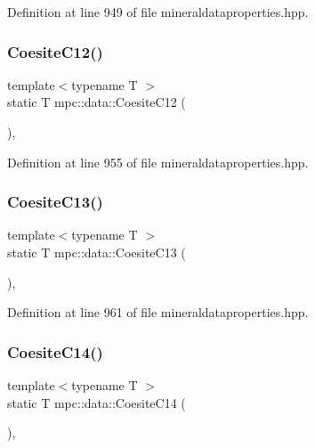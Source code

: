 Definition at line 949 of file mineraldataproperties.\+hpp.

\mbox{\label{namespacempc_1_1data_a0588a25ac2a6d4980bbe53e28e56f057}} 
\subsubsection{\texorpdfstring{Coesite\+C12()}{CoesiteC12()}}
{\footnotesize\ttfamily template$<$typename T $>$ \\
static T mpc\+::data\+::\+Coesite\+C12 (\begin{DoxyParamCaption}{ }\end{DoxyParamCaption})\hspace{0.3cm}{\ttfamily [inline]}, {\ttfamily [static]}}



Definition at line 955 of file mineraldataproperties.\+hpp.

\mbox{\label{namespacempc_1_1data_ad1e255951fc10a606cadd1ffcaf67b8d}} 
\subsubsection{\texorpdfstring{Coesite\+C13()}{CoesiteC13()}}
{\footnotesize\ttfamily template$<$typename T $>$ \\
static T mpc\+::data\+::\+Coesite\+C13 (\begin{DoxyParamCaption}{ }\end{DoxyParamCaption})\hspace{0.3cm}{\ttfamily [inline]}, {\ttfamily [static]}}



Definition at line 961 of file mineraldataproperties.\+hpp.

\mbox{\label{namespacempc_1_1data_a48025f0c08f0bb7de3af84fffc200397}} 
\subsubsection{\texorpdfstring{Coesite\+C14()}{CoesiteC14()}}
{\footnotesize\ttfamily template$<$typename T $>$ \\
static T mpc\+::data\+::\+Coesite\+C14 (\begin{DoxyParamCaption}{ }\end{DoxyParamCaption})\hspace{0.3cm}{\ttfamily [inline]}, {\ttfamily [static]}}



